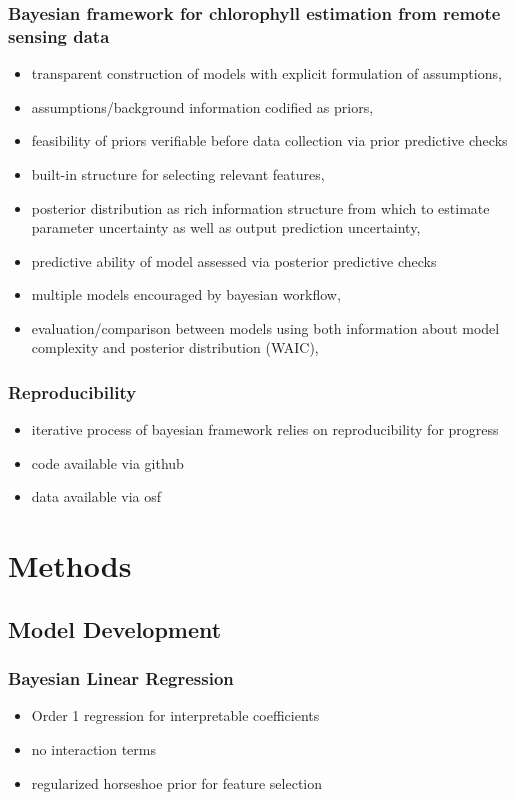 \documentclass[10pt]{article}
\begin{document}
		\subsubsection{Bayesian framework for chlorophyll estimation from remote sensing data}
			\begin{itemize}
				\item transparent construction of models with explicit formulation of assumptions,
				\item assumptions/background information codified as priors,
				\item feasibility of priors verifiable before data collection via prior predictive checks
				\item built-in structure for selecting relevant features,
				\item posterior distribution as rich information structure from which to estimate parameter uncertainty as well as output prediction uncertainty,
				\item predictive ability of model assessed via posterior predictive checks
				\item multiple models encouraged by bayesian workflow,
				\item evaluation/comparison between models using both information about model complexity and posterior distribution (WAIC),
			\end{itemize}
		\subsubsection{Reproducibility}
			\begin{itemize}
				\item iterative process of bayesian framework relies on reproducibility for progress
				\item code available via github
				\item data available via osf
			\end{itemize}
			

\section{Methods}

	\subsection{Model Development}		
		\subsubsection{Bayesian Linear Regression}
			\begin{itemize}
				\item Order 1 regression for interpretable coefficients
				\item no interaction terms
				\item regularized horseshoe prior for feature selection
			\end{itemize}
\end{document}

